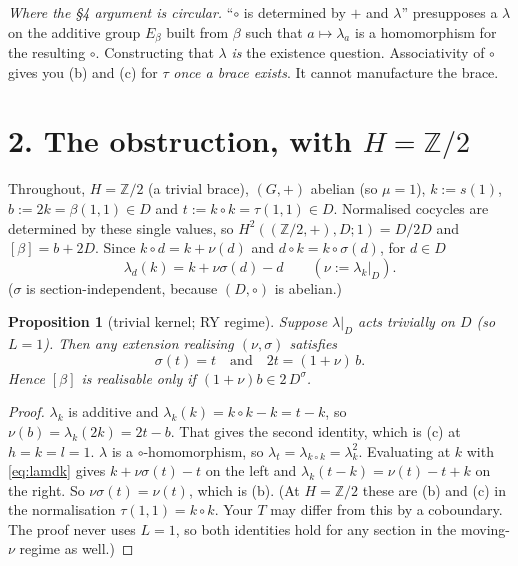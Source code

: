 \documentclass[11pt]{article}
\newtheorem{proposition}{Proposition}
\theoremstyle{remark}
\newcommand{\Z}{\mathbb Z}
\begin{document}
\emph{Where the \S4 argument is circular.} ``$\circ$ is determined by $+$ and $\lambda$'' presupposes a $\lambda$ on the
additive group $E_\beta$ built from $\beta$ such that $a\mapsto\lambda_a$ is a homomorphism for the resulting $\circ$.
Constructing that $\lambda$ \emph{is} the existence question. Associativity of $\circ$ gives you (b) and (c) for $\tau$
\emph{once a brace exists}. It cannot manufacture the brace.

\section*{2. The obstruction, with $H=\Z/2$}
Throughout, $H=\Z/2$ (a trivial brace), $(G,+)$ abelian (so $\mu=1$), $k:=s(1)$, $b:=2k=\beta(1,1)\in D$ and
$t:=k\circ k=\tau(1,1)\in D$. Normalised cocycles are determined by these single values, so
$H^2((\Z/2,+),D;1)=D/2D$ and $[\beta]=b+2D$. Since $k\circ d=k+\nu(d)$ and $d\circ k=k\circ\sigma(d)$, for $d\in D$
\begin{equation}\label{eq:lamdk}
\lambda_d(k)=k+\nu\sigma(d)-d\qquad(\nu:=\lambda_k|_D).
\end{equation}
($\sigma$ is section-independent, because $(D,\circ)$ is abelian.)

\begin{proposition}[trivial kernel; RY regime]\label{prop:A}
Suppose $\lambda|_D$ acts trivially on $D$ (so $L=1$). Then any extension realising $(\nu,\sigma)$ satisfies
\[
\sigma(t)=t\quad\text{and}\quad 2t=(1+\nu)\,b .
\]
Hence $[\beta]$ is realisable only if $(1+\nu)b\in 2\,D^{\sigma}$.
\end{proposition}
\begin{proof}
$\lambda_k$ is additive and $\lambda_k(k)=k\circ k-k=t-k$, so $\nu(b)=\lambda_k(2k)=2t-b$. That gives the second
identity, which is (c) at $h=k=l=1$. $\lambda$ is a $\circ$-homomorphism, so $\lambda_t=\lambda_{k\circ k}=\lambda_k^2$.
Evaluating at $k$ with \eqref{eq:lamdk} gives $k+\nu\sigma(t)-t$ on the left and $\lambda_k(t-k)=\nu(t)-t+k$ on the right. So
$\nu\sigma(t)=\nu(t)$, which is (b).
(At $H=\Z/2$ these are (b) and (c) in the normalisation $\tau(1,1)=k\circ k$. Your $T$ may differ from this by a coboundary.
The proof never uses $L=1$, so both identities hold for any section in the moving-$\nu$ regime as well.)
\end{proof}
\end{document}
